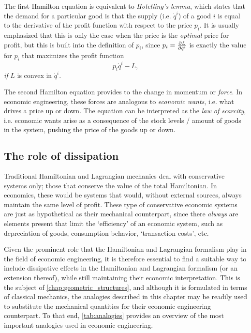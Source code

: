 The first Hamilton equation is equivalent to \emph{Hotelling's lemma}, which states that the demand for a particular good is that the supply (i.e. \(\dot{q}^i\)) of a good \(i\) is equal to the derivative of the profit function with respect to the price \(p_i\). It is usually emphasized that this is only the case when the price is the \emph{optimal} price for profit, but this is built into the definition of \(p_i\), since \(p_i = \pdv{L}{\dot{q}^i}\) is exactly the value for \(p_i\) that maximizes the profit function
\begin{equation}
     p_i\dot{q}^i - L,
\end{equation}
\emph{if} \(L\) is convex in \(\dot{q}^i\).

The second Hamilton equation provides to the change in momentum or \emph{force}. In economic engineering, these forces are analogous to \emph{economic wants}, i.e. what drives a price up or down. The equation can be interpreted as the \emph{law of scarcity}, i.e. economic wants arise as a consequence of the stock levels / amount of goods in the system, pushing the price of the goods up or down.

\subsection{The role of dissipation} 
Traditional Hamiltonian and Lagrangian mechanics deal with conservative systems only; those that conserve the value of the total Hamiltonian. In economics, these would be systems that would, without external sources, always maintain the same level of profit. These type of conservative economic systems are just as hypothetical as their mechanical counterpart, since there \emph{always} are elements present that limit the `efficiency' of an economic system, such as depreciation of goods, consumption behavior, `transaction costs', etc. 

Given the prominent role that the Hamiltonian and Lagrangian formalism play in the field of economic engineering, it is therefore essential to find a suitable way to include dissipative effects in the Hamiltonian and Lagrangian formalism (or an extension thereof), while still maintaining their economic interpretation. This is the subject of \cref{chap:geometric_structures}, and although it is formulated in terms of classical mechanics, the analogies described in this chapter may be readily used to substitute the mechanical quantities for their economic engineering counterpart. To that end, \cref{tab:analogies} provides an overview of the most important analogies used in economic engineering.

